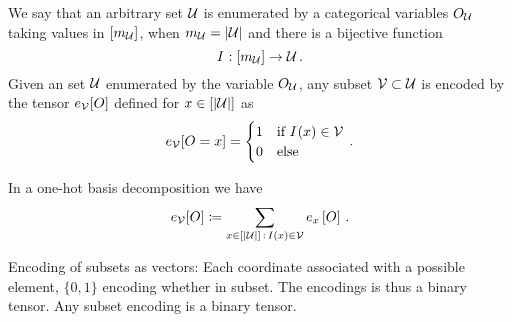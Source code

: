 \begin{definition}\label{def:subsetEncoding}
	We say that an arbitrary set $\mathcal{U}$ is enumerated by a categorical variables $O_{\mathcal{U}}$ taking values in $[m_{\mathcal{U}}]$, when $m_{\mathcal{U}}=\left|\mathcal{U}\right|$ and there is a bijective function
		\[ I^{} : [m_{\mathcal{U}}] \rightarrow \mathcal{U} \, . \]
	Given an set $\mathcal{U}$ enumerated by the variable $O_{\mathcal{U}}$, any subset $\mathcal{V}\subset\mathcal{U}$ is encoded by the tensor $e_{\mathcal{V}}[O]$ defined for $x\in[\left|\mathcal{U}\right|]$ as
	\begin{align}
	 	e_{\mathcal{V}}[O={x}] = \begin{cases}
		1 & \text{if } I^{}(x) \in \mathcal{V} \\
		0 & \text{else}
		\end{cases} \, . 
	\end{align}
\end{definition}




In a one-hot basis decomposition we have
	\[ e_{\mathcal{V}}[O] \coloneqq \sum_{x\in[\left|\mathcal{U}\right|] \, : \, I(x)\in\mathcal{V}}e_{x}\left[O\right] \, . \]

Encoding of subsets as vectors: Each coordinate associated with a possible element, $\{0,1\}$ encoding whether in subset.
The encodings is thus a binary tensor.
Any subset encoding is a binary tensor.

